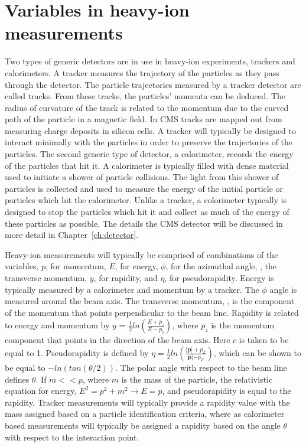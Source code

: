   \section{Variables in heavy-ion measurements}
    Two types of generic detectors are in use in heavy-ion experiments, 
      trackers and calorimeters. 
    A tracker measures the trajectory of the particles as they pass through 
      the detector.
    The particle trajectories measured by a tracker detector are called 
      tracks.
    From these tracks, the particles' momenta can be deduced.
    The radius of curvature of the track is related to the momentum 
      due to the curved path of the particle in a magnetic field. 
    In CMS tracks are mapped out from measuring charge deposits in silicon
      cells.
    A tracker will typically be designed to interact minimally with the 
      particles in order to preserve the trajectories of the particles. 
    The second generic type of detector, a calorimeter, records the energy 
      of the particles that hit it. 
    A calorimeter is typically filled with dense material used to initiate a 
      shower of particle collisions.
    The light from this shower of particles is collected and used to measure 
      the energy of the initial particle or particles which hit the 
      calorimeter.
    Unlike a tracker, a colorimeter typically is designed to stop the particles
      which hit it and collect as much of the energy of these particles as 
      possible.
    The details the CMS detector will be discussed in more detail in 
     Chapter~\ref{ch:detector}.

    Heavy-ion measurements will typically be comprised of 
      combinations of the variables, $p$, for momentum, $E$, for energy, 
      $\phi$, for the azimuthal angle, \pt, the transverse momentum, $y$, 
      for rapidity, and $\eta$, for pseudorapidity. 
    Energy is typically measured by a calorimeter and momentum by a tracker.
    The $\phi$ angle is measured around the beam axis. 
    The transverse momentum, \pt, is the component of the momentum that points
      perpendicular to the beam line. 
    Rapidity is related to energy and momentum by 
    $y$ = $\frac{1}{2}ln\left(\frac{E+p_{z}}{E-p_{z}}\right)$, where $p_{z}$ 
      is the momentum component that points in the direction of the beam axis. 
    Here $c$ is taken to be equal to 1. 
    Pseudorapidity is defined by
      $\eta=\frac{1}{2}ln\left(\frac{|\mathbf{p}|+p_{Z}}{\mathbf{p}|-p_{Z}}\right)$, 
      which can be shown to be equal to $-ln\left(tan\left(\theta/2\right)\right)$.
    The polar angle with respect to the beam line defines $\theta$.
    If $m << p$, where $m$ is the mass of the particle, the 
      relativistic equation for energy, $E^2=p^2+m^2 \rightarrow E=p$, and 
      pseudorapidity is equal to the rapidity. 
    Tracker measurements will typically provide a rapidity value with 
      the mass assigned based on a particle identification criteria, where as 
      calorimeter based measurements will typically be assigned a rapidity 
      based on the angle $\theta$ with respect to the interaction point.

